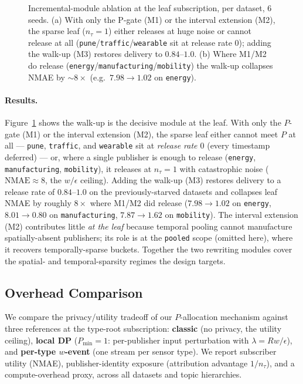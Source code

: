 \begin{figure}[t]
\begin{subfigure}{0.49\linewidth}
\end{subfigure}
\caption{Incremental-module ablation at the leaf subscription, per dataset, 6 seeds. (a) With only the P-gate (M1) or the interval extension (M2), the sparse leaf ($n_\tau{=}1$) either releases at huge noise or cannot release at all (\texttt{pune}/\texttt{traffic}/\texttt{wearable} sit at release rate $0$); adding the walk-up (M3) restores delivery to $0.84$--$1.0$. (b) Where M1/M2 do release (\texttt{energy}/\texttt{manufacturing}/\texttt{mobility}) the walk-up collapses NMAE by $\sim\!8\times$ (e.g.\ $7.98\!\to\!1.02$ on \texttt{energy}).}\label{fig:exp-ablation}
\end{figure}

\paragraph{Results.} Figure~\ref{fig:exp-ablation} shows the walk-up is the decisive module at the leaf. With only the $P$-gate (M1) or the interval extension (M2), the sparse leaf either cannot meet $P$ at all --- \texttt{pune}, \texttt{traffic}, and \texttt{wearable} sit at \emph{release rate $0$} (every timestamp deferred) --- or, where a single publisher is enough to release (\texttt{energy}, \texttt{manufacturing}, \texttt{mobility}), it releases at $n_\tau=1$ with catastrophic noise ($\mathrm{NMAE}\approx 8$, the $w/\epsilon$ ceiling). Adding the walk-up (M3) restores delivery to a release rate of $0.84$--$1.0$ on the previously-starved datasets and collapses leaf NMAE by roughly $8\times$ where M1/M2 did release ($7.98\!\to\!1.02$ on \texttt{energy}, $8.01\!\to\!0.80$ on \texttt{manufacturing}, $7.87\!\to\!1.62$ on \texttt{mobility}). The interval extension (M2) contributes little \emph{at the leaf} because temporal pooling cannot manufacture spatially-absent publishers; its role is at the \texttt{pooled} scope (omitted here), where it recovers temporally-sparse buckets. Together the two rewriting modules cover the spatial- and temporal-sparsity regimes the design targets.

\subsection{Overhead Comparison}
\label{sec:overhead}
We compare the privacy/utility tradeoff of our $P$-allocation mechanism against three references at the type-root subscription: \textbf{classic} (no privacy, the utility ceiling), \textbf{local DP} ($P_{\min}=1$: per-publisher input perturbation with $\lambda=Rw/\epsilon$), and \textbf{per-type $w$-event} (one stream per sensor type). We report subscriber utility (NMAE), publisher-identity exposure (attribution advantage $1/n_\tau$), and a compute-overhead proxy, across all datasets and topic hierarchies.

